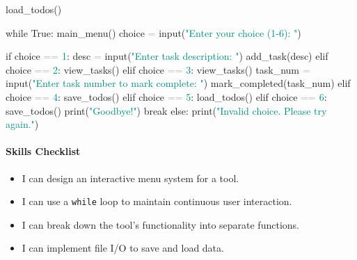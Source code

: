 \documentclass[
  justified,
  openright,
]{tufte-book}
\let\subsubsection\paragraph
\let\paragraph\paragraph
\newcommand{\BuiltInTok}[1]{#1}
\newcommand{\ControlFlowTok}[1]{\textcolor{BrandBlue}{#1}}
\newcommand{\NormalTok}[1]{#1}
\newcommand{\OperatorTok}[1]{\textcolor{DarkGray}{#1}}
\newcommand{\StringTok}[1]{\textcolor{Teal}{#1}}
\newcommand{\VariableTok}[1]{#1}
\newenvironment{Shaded}{%
  \begin{snugshade}
}{%
  \end{snugshade}
}
\let\subsubsection\paragraph
\let\paragraph\paragraph
\providecommand{\tightlist}{%
  \setlength{\itemsep}{0pt}\setlength{\parskip}{0pt}}
\begin{document}
\begin{Shaded}
\begin{Highlighting}[]
\NormalTok{load\_todos()}

\ControlFlowTok{while} \VariableTok{True}\NormalTok{:}
\NormalTok{    main\_menu()}
\NormalTok{    choice }\OperatorTok{=} \BuiltInTok{input}\NormalTok{(}\StringTok{"Enter your choice (1{-}6): "}\NormalTok{)}

    \ControlFlowTok{if}\NormalTok{ choice }\OperatorTok{==} \StringTok{\textquotesingle{}1\textquotesingle{}}\NormalTok{:}
\NormalTok{        desc }\OperatorTok{=} \BuiltInTok{input}\NormalTok{(}\StringTok{"Enter task description: "}\NormalTok{)}
\NormalTok{        add\_task(desc)}
    \ControlFlowTok{elif}\NormalTok{ choice }\OperatorTok{==} \StringTok{\textquotesingle{}2\textquotesingle{}}\NormalTok{:}
\NormalTok{        view\_tasks()}
    \ControlFlowTok{elif}\NormalTok{ choice }\OperatorTok{==} \StringTok{\textquotesingle{}3\textquotesingle{}}\NormalTok{:}
\NormalTok{        view\_tasks()}
\NormalTok{        task\_num }\OperatorTok{=} \BuiltInTok{input}\NormalTok{(}\StringTok{"Enter task number to mark complete: "}\NormalTok{)}
\NormalTok{        mark\_completed(task\_num)}
    \ControlFlowTok{elif}\NormalTok{ choice }\OperatorTok{==} \StringTok{\textquotesingle{}4\textquotesingle{}}\NormalTok{:}
\NormalTok{        save\_todos()}
    \ControlFlowTok{elif}\NormalTok{ choice }\OperatorTok{==} \StringTok{\textquotesingle{}5\textquotesingle{}}\NormalTok{:}
\NormalTok{        load\_todos()}
    \ControlFlowTok{elif}\NormalTok{ choice }\OperatorTok{==} \StringTok{\textquotesingle{}6\textquotesingle{}}\NormalTok{:}
\NormalTok{        save\_todos()}
        \BuiltInTok{print}\NormalTok{(}\StringTok{"Goodbye!"}\NormalTok{)}
        \ControlFlowTok{break}
    \ControlFlowTok{else}\NormalTok{:}
        \BuiltInTok{print}\NormalTok{(}\StringTok{"Invalid choice. Please try again."}\NormalTok{)}
\end{Highlighting}
\end{Shaded}

\subsubsection{Skills Checklist}\label{skills-checklist-50}

\begin{itemize}
\tightlist
\item[$\square$]
  I can design an interactive menu system for a tool.
\item[$\square$]
  I can use a \texttt{while} loop to maintain continuous user
  interaction.
\item[$\square$]
  I can break down the tool's functionality into separate functions.
\item[$\square$]
  I can implement file I/O to save and load data.
\end{itemize}
\end{document}
